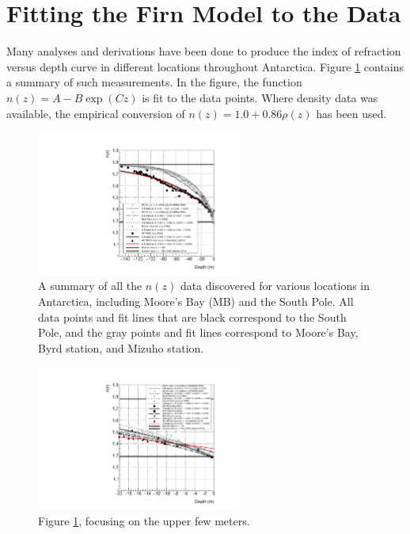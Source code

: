\documentclass[12pt]{article}
\begin{document}
\section{Fitting the Firn Model to the Data}
\label{sec:fit}

Many analyses and derivations have been done to produce the index of refraction versus depth curve in different locations throughout Antarctica.  Figure \ref{fig:fig1} contains a summary of such measurements.  In the figure, the function $n(z) = A-B\exp(Cz)$ is fit to the data points.  Where density data was available, the empirical conversion of $n(z) = 1.0 + 0.86\rho(z)$ has been used.

\begin{figure}[ht]
\centering
\includegraphics[width=0.6\textwidth]{figures/April21_plot1.pdf}
\caption{\label{fig:fig1} A summary of all the $n(z)$ data discovered for various locations in Antarctica, including Moore's Bay (MB) and the South Pole.  All data points and fit lines that are black correspond to the South Pole, and the gray points and fit lines correspond to Moore's Bay, Byrd station, and Mizuho station.}
\end{figure}

\begin{figure}[ht]
\centering
\includegraphics[width=0.6\textwidth]{figures/April21_plot2.pdf}
\caption{\label{fig:fig1a} Figure \ref{fig:fig1}, focusing on the upper few meters.}
\end{figure}
\end{document}
